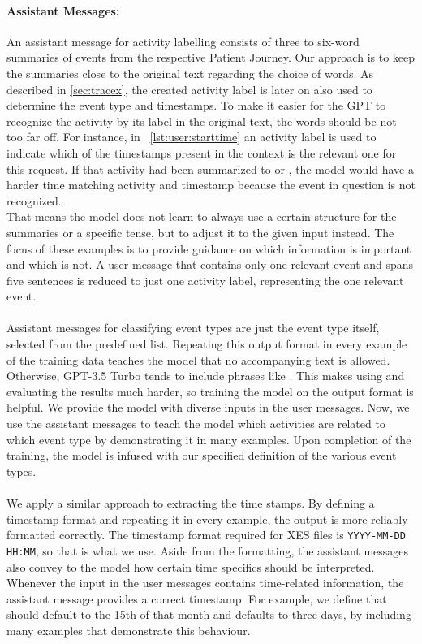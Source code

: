 \paragraph{Assistant Messages:} An assistant message for activity labelling consists of three to six-word summaries of events from the respective Patient Journey. Our approach is to keep the summaries close to the original text regarding the choice of words. As described in \autoref{sec:tracex}, the created activity label is later on also used to determine the event type and timestamps. To make it easier for the GPT to recognize the activity by its label in the original text, the words should be not too far off. For instance, in ~\autoref{lst:user:starttime} an activity label is used to indicate which of the timestamps present in the context is the relevant one for this request. If that activity had been summarized to  or , the model would have a harder time matching activity and timestamp because the event in question is not recognized.\\
That means the model does not learn to always use a certain structure for the summaries or a specific tense, but to adjust it to the given input instead. The focus of these examples is to provide guidance on which information is important and which is not. A user message that contains only one relevant event and spans five sentences is reduced to just one activity label, representing the one relevant event.\\\\
Assistant messages for classifying event types are just the event type itself, selected from the predefined list. Repeating this output format in every example of the training data teaches the model that no accompanying text is allowed. Otherwise, GPT-3.5 Turbo tends to include phrases like . This makes using and evaluating the results much harder, so training the model on the output format is helpful. We provide the model with diverse inputs in the user messages. Now, we use the assistant messages to teach the model which activities are related to which event type by demonstrating it in many examples. Upon completion of the training, the model is infused with our specified definition of the various event types. \\\\
We apply a similar approach to extracting the time stamps. By defining a timestamp format and repeating it in every example, the output is more reliably formatted correctly. The timestamp format required for XES files is \verb|YYYY-MM-DD HH:MM|, so that is what we use. Aside from the formatting, the assistant messages also convey to the model how certain time specifics should be interpreted. Whenever the input in the user messages contains time-related information, the assistant message provides a correct timestamp. For example, we define that  should default to the 15th of that month and  defaults to three days, by including many examples that demonstrate this behaviour. \\
